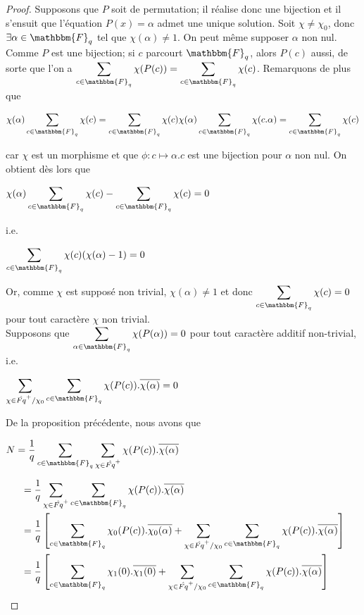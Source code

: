 \documentclass[12pt]{article}
\theoremstyle{remark}\newtheorem{note}{Note}
\theoremstyle{remark}\newtheorem{nota}{Notation}
\newcommand{\Fq}{\mathbbm{F}_q}
\theoremstyle{definition}
\begin{document}
\begin{proof}
	\fbox{$\Rightarrow$} Supposons que $P$ soit de permutation; il réalise donc une bijection et il s'ensuit que l'équation $P(x) = \alpha$ admet une unique solution. Soit $\chi \neq \chi_0$, donc $\exists \alpha \in \Fq$ tel que $\chi(\alpha)\neq 1$. On peut même supposer $\alpha$ non nul. Comme $P$ est une bijection; si $c$ parcourt $\Fq$, alors $P(c)$ aussi, de sorte que l'on a $\displaystyle\sum_{c\in\Fq}\chi(P(c)) = \displaystyle\sum_{c\in\Fq}\chi(c)$. \newline
Remarquons de plus que
\begin{center}$\chi(\alpha)\displaystyle\sum_{c\in\Fq}\chi(c) = \displaystyle\sum_{c\in\Fq}\chi(c)\chi(\alpha) \displaystyle\sum_{c\in\Fq}\chi(c.\alpha) =\displaystyle\sum_{c\in\Fq}\chi(c)$\end{center}
car $\chi$ est un morphisme et que $\phi :c \longmapsto \alpha.c$ est une bijection pour $\alpha$ non nul.
On obtient dès lors que
\begin{center} 
$\chi(\alpha)\displaystyle\sum_{c\in\Fq}\chi(c) - \displaystyle\sum_{c\in\Fq}\chi(c) =0$
\end{center}
i.e.
\begin{center}
$\displaystyle\sum_{c\in\Fq}\chi(c)(\chi(\alpha) -1) = 0$
\end{center}
Or, comme $
\chi$ est supposé non trivial, $\chi(\alpha) \neq 1$ et donc $\displaystyle\sum_{c\in\Fq}\chi(c) = 0$ pour tout caractère $\chi$ non trivial.\\
 \fbox{$\Leftarrow$} Supposons que $\displaystyle\sum_{\alpha \in \Fq} \chi(P(\alpha)) = 0$ pour tout caractère additif non-trivial, i.e. 
		\begin{center} $\displaystyle	\sum_{\chi \in \hat{Fq}^+/\chi_0} \sum_{c\in\Fq} \chi(P(c)).\overline{\chi(\alpha)}=0$ \end{center}
De la proposition précédente, nous avons que 
\begin{center} $N = \displaystyle \frac{1}{q} \sum_{c\in\Fq}\sum_{\chi \in \hat{Fq}^+} \chi(P(c)).\overline{\chi(\alpha)}$ \end{center}
\begin{align*}
&= \displaystyle \frac{1}{q}\sum_{\chi \in \hat{Fq}^+}  \sum_{c\in\Fq}\chi(P(c)).\overline{\chi(\alpha)}\\
&= \displaystyle \frac{1}{q}\left[\sum_{c\in\Fq} \chi_0(P(c)).\overline{\chi_0(\alpha)}+\sum_{\chi \in \hat{Fq}^+/\chi_0} \sum_{c\in\Fq} \chi(P(c)).\overline{\chi(\alpha)}\right]\\
&= \displaystyle \frac{1}{q}\left[\sum_{c\in\Fq} \chi_1(0).\overline{\chi_1(0)}+\sum_{\chi \in \hat{Fq}^+/\chi_0} \sum_{c\in\Fq} \chi(P(c)).\overline{\chi(\alpha)}\right]\\

\end{align*}
\end{proof}
\end{document}
